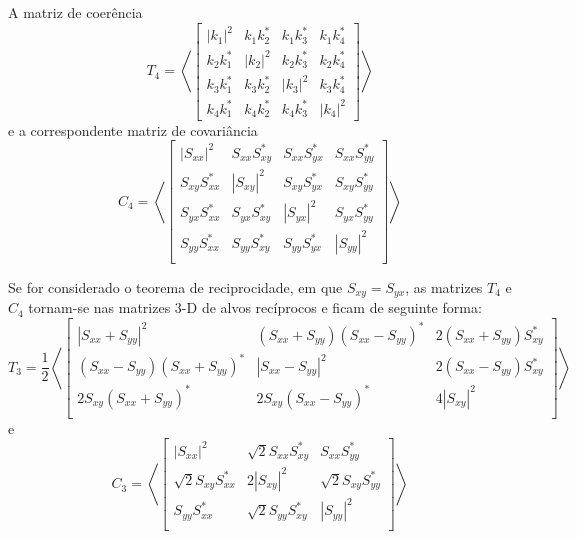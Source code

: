 \documentclass[a4paper,12pt]{article}
\begin{document}
A matriz de coerência
\begin{equation}
    T_{4} = \left\langle 
    \begin{bmatrix}
        |k_{1}|^2 & k_{1}k_{2}^* & k_{1}k_{3}^* & k_{1}k_{4}^* \\
        k_{2}k_{1}^* & |k_{2}|^2 & k_{2}k_{3}^* & k_{2}k_{4}^* \\
        k_{3}k_{1}^* & k_{3}k_{2}^* & |k_{3}|^2 & k_{3}k_{4}^* \\
        k_{4}k_{1}^* & k_{4}k_{2}^* & k_{4}k_{3}^* & |k_{4}|^2 
    \end{bmatrix} \right \rangle 
\end{equation}
e a correspondente matriz de covariância \newline
\begin{equation}
    C_{4} = \left \langle
    \begin{bmatrix}
        |S_{xx}|^2 & S_{xx}S_{xy}^* & S_{xx}S_{yx}^* & S_{xx}S_{yy}^*\\
        S_{xy}S_{xx}^* & |S_{xy}|^2 & S_{xy}S_{yx}^* & S_{xy}S_{yy}^*\\
        S_{yx}S_{xx}^* & S_{yx}S_{xy}^* & |S_{yx}|^2 & S_{yx}S_{yy}^*\\
        S_{yy}S_{xx}^* & S_{yy}S_{xy}^* & S_{yy}S_{yx}^* & |S_{yy}|^2\\
    \end{bmatrix} \right \rangle
\end{equation}

Se for considerado o teorema de reciprocidade, em que $S_{xy} = S_{yx}$, as matrizes $T_{4}$ e $C_{4}$ tornam-se nas matrizes 3-D de alvos recíprocos e ficam de seguinte forma: 
\begin{equation}
    T_{3} = \frac{1}{2} \left \langle
    \begin{bmatrix}
        |S_{xx}+S_{yy}|^2 & (S_{xx}+S_{yy})(S_{xx}-S_{yy})^* & 2(S_{xx}+S_{yy})S_{xy}^*\\
        (S_{xx}-S_{yy})(S_{xx}+S_{yy})^* & |S_{xx}-S_{yy}|^2 & 2(S_{xx}-S_{yy})S_{xy}^*\\
        2S_{xy}(S_{xx}+S_{yy})^* & 2S_{xy}(S_{xx}-S_{yy})^* & 4|S_{xy}|^2\\
    \end{bmatrix} \right \rangle
\end{equation}
e
\begin{equation}
    C_{3} =  \left \langle
    \begin{bmatrix}
        |S_{xx}|^2 & \sqrt{2}S_{xx}S_{xy}^* & S_{xx}S_{yy}^*\\
        \sqrt{2}S_{xy}S_{xx}^* & 2|S_{xy}|^2 & \sqrt{2}S_{xy}S_{yy}^*\\
        S_{yy}S_{xx}^* & \sqrt{2}S_{yy}S_{xy}^* & |S_{yy}|^2\\    
    \end{bmatrix} \right \rangle
\end{equation}
\end{document}
